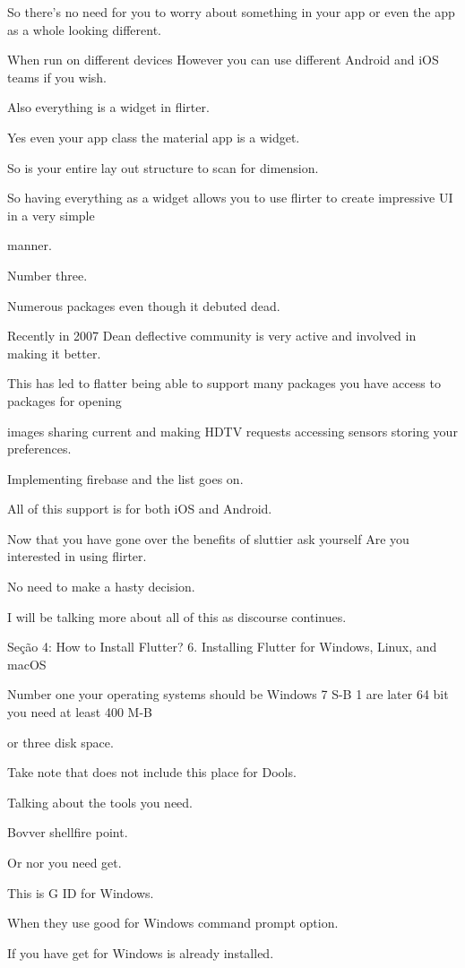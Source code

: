 So there's no need for you to worry about something in your app or even the app as a whole looking different.

When run on different devices However you can use different Android and iOS teams if you wish.

Also everything is a widget in flirter.

Yes even your app class the material app is a widget.

So is your entire lay out structure to scan for dimension.

So having everything as a widget allows you to use flirter to create impressive UI in a very simple

manner.

Number three.

Numerous packages even though it debuted dead.

Recently in 2007 Dean deflective community is very active and involved in making it better.

This has led to flatter being able to support many packages you have access to packages for opening

images sharing current and making HDTV requests accessing sensors storing your preferences.

Implementing firebase and the list goes on.

All of this support is for both iOS and Android.

Now that you have gone over the benefits of sluttier ask yourself Are you interested in using flirter.

No need to make a hasty decision.

I will be talking more about all of this as discourse continues.

Seção 4: How to Install Flutter?
6. Installing Flutter for Windows, Linux, and macOS

Number one your operating systems should be Windows 7 S-B 1 are later 64 bit you need at least 400 M-B

or three disk space.

Take note that does not include this place for Dools.

Talking about the tools you need.

Bovver shellfire point.

Or nor you need get.

This is G ID for Windows.

When they use good for Windows command prompt option.

If you have get for Windows is already installed.

